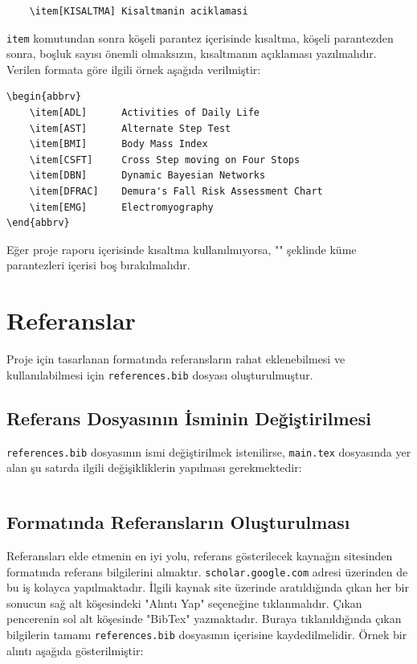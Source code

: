 \begin{verbatim}
    \item[KISALTMA] Kisaltmanin aciklamasi
\end{verbatim}

\texttt{item} komutundan sonra köşeli parantez içerisinde kısaltma, köşeli parantezden sonra, boşluk sayısı önemli olmaksızın, kısaltmanın açıklaması yazılmalıdır. Verilen formata göre ilgili örnek aşağıda verilmiştir:

\begin{verbatim}
\begin{abbrv}
    \item[ADL]      Activities of Daily Life
    \item[AST]      Alternate Step Test
    \item[BMI]      Body Mass Index
    \item[CSFT]     Cross Step moving on Four Stops
    \item[DBN]      Dynamic Bayesian Networks
    \item[DFRAC]    Demura's Fall Risk Assessment Chart
    \item[EMG]      Electromyography 
\end{abbrv}
\end{verbatim}

Eğer proje raporu içerisinde kısaltma kullanılmıyorsa, "\texttt{\def\abbrevations{}}" şeklinde küme parantezleri içerisi boş bırakılmalıdır.

\section{Referanslar}
Proje için tasarlanan \latex formatında referansların rahat eklenebilmesi ve kullanılabilmesi için \texttt{references.bib} dosyası oluşturulmuştur.

\subsection{Referans Dosyasının İsminin Değiştirilmesi}
\texttt{references.bib} dosyasının ismi değiştirilmek istenilirse, \texttt{main.tex} dosyasında yer alan şu satırda ilgili değişikliklerin yapılması gerekmektedir:

\begin{verbatim}

\end{verbatim}

\subsection{\latex Formatında Referansların Oluşturulması}
Referansları elde etmenin en iyi yolu, referans gösterilecek kaynağın sitesinden \latex formatında referans bilgilerini almaktır. \texttt{scholar.google.com} adresi üzerinden de bu iş kolayca yapılmaktadır. İlgili kaynak site üzerinde aratıldığında çıkan her bir sonucun sağ alt köşesindeki "Alıntı Yap" seçeneğine tıklanmalıdır. Çıkan pencerenin sol alt köşesinde "BibTex" yazmaktadır. Buraya tıklanıldığında çıkan bilgilerin tamamı \texttt{references.bib} dosyasının içerisine  kaydedilmelidir. Örnek bir alıntı aşağıda gösterilmiştir:

